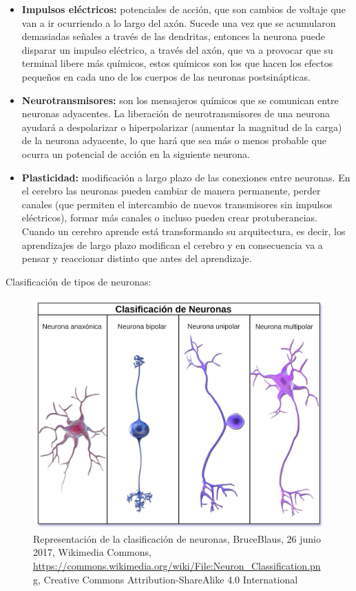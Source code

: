 \begin{itemize}
\item \textbf{Impulsos eléctricos:} potenciales de acción, que son cambios de voltaje que van a ir ocurriendo a lo largo del axón. Sucede una vez que se acumularon demasiadas señales a través de las dendritas, entonces la neurona puede disparar un impulso eléctrico, a través del axón, que va a provocar que su terminal libere más químicos, estos químicos son los que hacen los efectos pequeños en cada uno de los cuerpos de las neuronas postsinápticas.

\item \textbf{Neurotransmisores:} son los mensajeros químicos que se comunican entre neuronas adyacentes. La liberación de neurotransmisores de una neurona ayudará a despolarizar o hiperpolarizar (aumentar la magnitud de la carga) de la neurona adyacente, lo que hará que sea más o menos probable que ocurra un potencial de acción en la siguiente neurona.
 
\item \textbf{Plasticidad:} modificación a largo plazo de las conexiones entre neuronas. En el cerebro las neuronas pueden cambiar de manera permanente, perder canales (que permiten el intercambio de nuevos transmisores sin impulsos eléctricos), formar más canales o incluso pueden crear protuberancias. Cuando un cerebro aprende está transformando su arquitectura, es decir, los aprendizajes de largo plazo modifican el cerebro y en consecuencia va a pensar y reaccionar distinto que antes del aprendizaje.
\end{itemize}




Clasificación de tipos de neuronas:


\begin{figure}[h]
 \centering
 \includegraphics[scale=0.15]{../Figuras/tiposDeNeuronas.png}
 \caption{Representación de la clasificación de neuronas, BruceBlaus, 26 junio 2017, Wikimedia Commons, \url{https://commons.wikimedia.org/wiki/File:Neuron_Classification.png}, Creative Commons Attribution-ShareAlike 4.0 International}
 \label{fig:tiposNeuro}
\end{figure}




